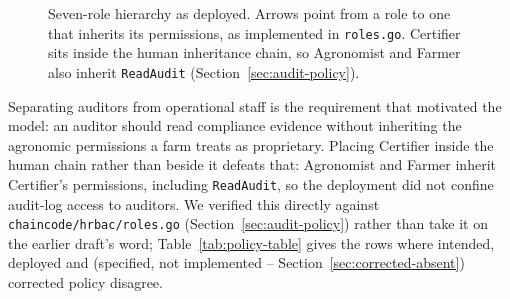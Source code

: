 \begin{figure}[H]
\centering
{}
\caption{Seven-role hierarchy as deployed. Arrows point from a role to one that inherits its permissions, as implemented in \texttt{roles.go}. Certifier sits inside the human inheritance chain, so Agronomist and Farmer also inherit \texttt{ReadAudit} (Section~\ref{sec:audit-policy}).}
\label{fig:hierarchy}
\end{figure}

Separating auditors from operational staff is the requirement that motivated the model: an auditor should read compliance evidence without inheriting the agronomic permissions a farm treats as proprietary. Placing Certifier inside the human chain rather than beside it defeats that: Agronomist and Farmer inherit Certifier's permissions, including \texttt{ReadAudit}, so the deployment did not confine audit-log access to auditors. We verified this directly against \texttt{chaincode/hrbac/roles.go} (Section~\ref{sec:audit-policy}) rather than take it on the earlier draft's word; Table~\ref{tab:policy-table} gives the rows where intended, deployed and (specified, not implemented -- Section~\ref{sec:corrected-absent}) corrected policy disagree.


